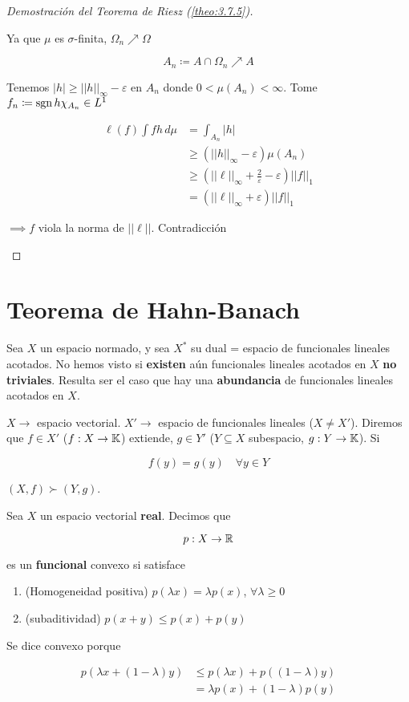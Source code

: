 \begin{proof}[Demostración del Teorema de Riesz (\ref{theo:3.7.5})]
\begin{enumerate}[label=(\alph*)]
            Ya que $\mu$ es $\sigma$-finita, $\Omega_n\nearrow \Omega$

            \[A_n\coloneqq A\cap \Omega_n\nearrow A\]

            Tenemos $|h|\geq ||h||_\infty-\varepsilon$ en $A_n$ donde $0<\mu(A_n)<\infty$. Tome $f_n\coloneqq \operatorname{sgn} h\chi_{A_n}\in L^1$

            \begin{align*}
                \ell(f)\int fh\,d\mu&=\int_{A_n} |h|\\
                &\geq (||h||_\infty-\varepsilon)\mu(A_n)\\
                &\geq (||\ell||_\infty+\frac2\varepsilon-\varepsilon)||f||_1\\
                &=(||\ell||_\infty +\varepsilon)||f||_1
            \end{align*}

            $\implies f$ viola la norma de $||\ell||$. Contradicción
        \end{enumerate}
\end{proof}

\section{Teorema de Hahn-Banach}

Sea $X$ un espacio normado, y sea $X^*$ su dual = espacio de funcionales lineales acotados. No hemos visto si \textbf{existen} aún funcionales lineales acotados en $X$ \textbf{no triviales}. Resulta ser el caso que hay una \textbf{abundancia} de funcionales lineales acotados en $X$.

$X\rightarrow$ espacio vectorial. $X'\rightarrow$ espacio de funcionales lineales ($X\neq X'$). Diremos que $f\in X'$ ($f:X\to\mathbb{K}$) extiende, $g\in Y'$ ($Y\subseteq X$ subespacio, $g:Y\to\mathbb{K}$). Si 

\[f(y)=g(y)\quad\forall y\in Y\]

$(X,f)\succ (Y,g)$.

\begin{fdefinition}
    Sea $X$ un espacio vectorial \textbf{real}. Decimos que 

    \[p:X\to \mathbb{R}\]

    es un \textbf{funcional} convexo si satisface 

    \begin{enumerate}
        \item (Homogeneidad positiva) $p(\lambda x)=\lambda p(x)$, $\forall \lambda\geq 0$
        \item (subaditividad) $p(x+y)\leq p(x)+p(y)$
    \end{enumerate}

    Se dice convexo porque

    \begin{align*}
        p(\lambda x+(1-\lambda)y)&\leq p(\lambda x)+p((1-\lambda)y)\\
        &=\lambda p(x)+(1-\lambda)p(y)
    \end{align*}
\end{fdefinition}

